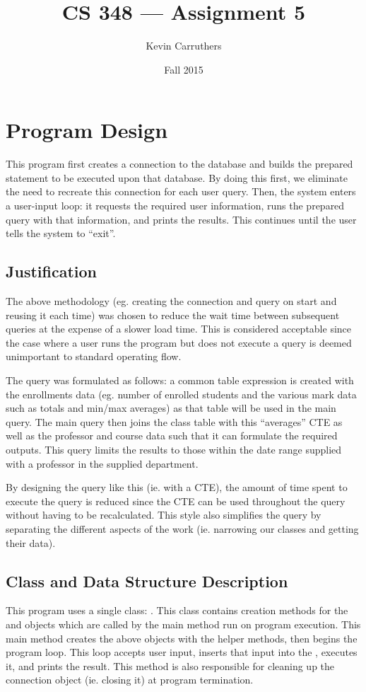 \documentclass[12pt]{article}
\begin{document}
\title{CS 348 --- Assignment 5}
\author{Kevin Carruthers}
\date{\vspace{-2ex}Fall 2015}
\maketitle\HRule

\section{Program Design}
This program first creates a connection to the database and builds the prepared statement to be executed upon that database. By doing this first, we eliminate the need to recreate this connection for each user query. Then, the system enters a user-input loop: it requests the required user information, runs the prepared query with that information, and prints the results. This continues until the user tells the system to ``exit''.

\subsection{Justification}
The above methodology (eg. creating the connection and query on start and reusing it each time) was chosen to reduce the wait time between subsequent queries at the expense of a slower load time. This is considered acceptable since the case where a user runs the program but does not execute a query is deemed unimportant to standard operating flow.

The query was formulated as follows: a common table expression is created with the enrollments data (eg. number of enrolled students and the various mark data such as totals and min/max averages) as that table will be used in the main query. The main query then joins the class table with this ``averages'' CTE as well as the professor and course data such that it can formulate the required outputs. This query limits the results to those within the date range supplied with a professor in the supplied department.

By designing the query like this (ie. with a CTE), the amount of time spent to execute the query is reduced since the CTE can be used throughout the query without having to be recalculated. This style also simplifies the query by separating the different aspects of the work (ie. narrowing our classes and getting their data).

\subsection{Class and Data Structure Description}
This program uses a single class: . This class contains creation methods for the  and  objects which are called by the main method run on program execution. This main method creates the above objects with the helper methods, then begins the program loop. This loop accepts user input, inserts that input into the , executes it, and prints the result. This method is also responsible for cleaning up the connection object (ie. closing it) at program termination.
\end{document}
